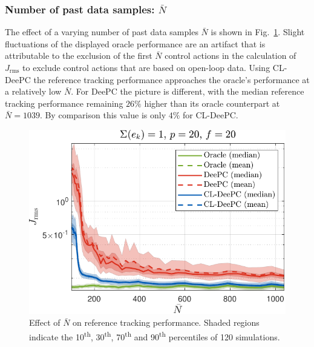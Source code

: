 \subsubsection{Number of past data samples: $\bar{N}$}
\noindent The effect of a varying number of past data samples $\bar{N}$ is shown in Fig.~\ref{fig:varying_Nbar}. Slight fluctuations of the displayed oracle performance are an artifact that is attributable to the exclusion of the first $\bar{N}$ control actions in the calculation of $J_\mathrm{rms}$ to exclude control actions that are based on open-loop data. Using \ac{CL-DeePC} the reference tracking performance approaches the oracle's performance at a relatively low $\bar{N}$. For \ac{DeePC} the picture is different, with the median reference tracking performance remaining $26\%$ higher than its oracle counterpart at $\bar{N}=1039$. By comparison this value is only $4\%$ for \ac{CL-DeePC}.
\begin{figure}[t!]
\begin{center}
\includegraphics[width=\columnwidth]{results/figures/Varying_Nbar_99-1039-50_p_20_f_20_Re_1_Ru_1_Rdu_0_Q_100_R_0_dR_10.pdf}    %
\caption{Effect of $\bar{N}$ on reference tracking performance. Shaded regions indicate the 10\textsuperscript{th}, 30\textsuperscript{th}, 70\textsuperscript{th} and 90\textsuperscript{th} percentiles of 120 simulations.\\}  %
\label{fig:varying_Nbar}                                 %
\end{center}                                 %
\end{figure}

